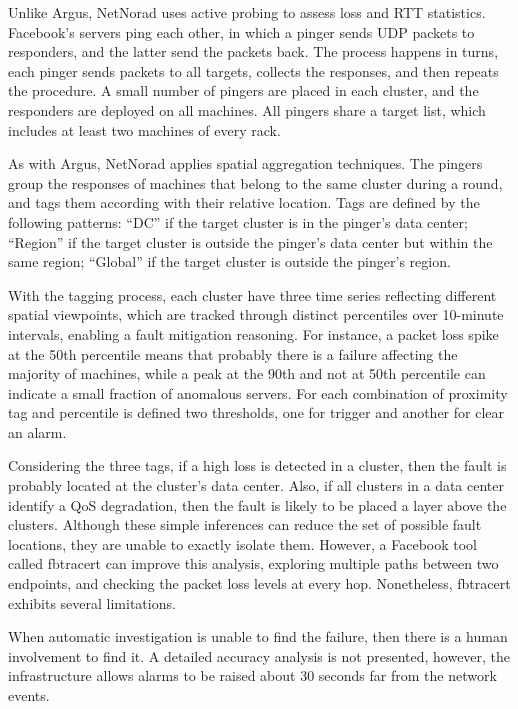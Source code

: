 Unlike Argus, NetNorad uses active probing to assess loss and RTT statistics.
Facebook's servers ping each other, in which
a pinger sends UDP packets to responders, and the latter
send the packets back. The process happens in turns, each pinger
sends packets to all targets, collects the responses, and then repeats
the procedure. A small number of pingers are placed in each cluster,
and the responders are
deployed on all machines. All pingers share a target list, which includes
at least two machines of every rack.

As with Argus, NetNorad applies spatial aggregation techniques.
The pingers group the responses of machines that belong to the same cluster
during a round, and tags them according with their relative location.
Tags are defined by the following patterns:
``DC'' if the target cluster is in the pinger's data center;
``Region'' if the target cluster is outside the pinger's
data center but within the same region;
``Global'' if the target cluster is outside the pinger's
region.

With the tagging process, each cluster have three time series reflecting
different spatial viewpoints, which are tracked through
distinct percentiles over 10-minute
intervals, enabling a fault mitigation reasoning.
For instance, a packet loss spike at the
50th percentile means that probably there is a failure affecting the majority of
machines, while a peak at the 90th and not at 50th
percentile can indicate a small fraction of anomalous servers.
For each combination of proximity tag and percentile is defined two
thresholds, one for trigger and another for clear an alarm.

Considering the three tags, if a high loss is detected in a cluster,
then the fault is probably located at the cluster's data center.
Also, if all clusters in a data center identify a QoS degradation,
then the fault is likely to be placed a layer above the clusters.
Although these simple inferences can reduce the set of possible fault locations,
they are unable to exactly isolate them.
However, a Facebook tool called fbtracert
can improve this analysis, exploring multiple
paths between two endpoints, and checking the
packet loss levels at every hop. Nonetheless, fbtracert exhibits several
limitations.

When automatic investigation is unable to find the failure, then there
is a human involvement to find it. A detailed accuracy analysis is not
presented, however, the infrastructure allows alarms to be raised about 30
seconds far from the network events.

